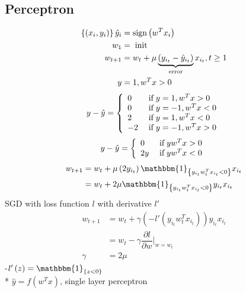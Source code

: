 \documentclass{article}
\begin{document}
\subsection{Perceptron}
\begin{align*}
\left\{\left(x_{i}, y_{i}\right)\right\} \hat{y}_{i} &= \text{sign}\left(w^{T} x_{i}\right)
\\ w_{1} &= \text{\;init\;}
\\ w_{t+1} &= w_{t} + \mu \underbrace{\left(y_{i_{t}} - \hat{y}_{i_{t}}\right)}_{\text{\;error\;}} x_{i_{t}}, t \geq  1
\\ y &= 1, w^{T} x > 0
\end{align*}
\[ y - \hat{y} =\left\{ \begin{array}{ll}
0& \text{\;if\;} y = 1, w^{T} x > 0 \\
0& \text{\;if\;} y = -1, w^{T} x < 0 \\
2& \text{\;if\;} y = 1, w^{T} x < 0 \\
-2& \text{\;if\;} y = -1, w^{T} x > 0 \\
\end{array}\right. \]
\[ y - \hat{y} =\left\{ \begin{array}{ll}
0& \text{\;if\;} y w^{T} x > 0 \\
2 y& \text{\;if\;} y w^{T} x < 0 \\
\end{array}\right. \]
\begin{align*}
w_{t+1} &= w_{t} + \mu \left(2 y_{i_{t}}\right) \mathbbm{1}_{\left\{y_{i_{t}} w_{t}^{T} x_{i_{t}} < 0\right\}} x_{i_{t}}
\\ &= w_{t} + 2 \mu \mathbbm{1}_{\left\{y_{i_{t}} w_{t}^{T} x_{i_{t}} < 0\right\}} y_{i_{t}} x_{i_{t}}
\end{align*}
SGD with loss function $l $ with derivative $l'$
\begin{align*}
w_{t+1} &= w_{t} + \gamma \left(-l'\left(y_{i_{t}} w_{t}^{T} x_{i_{t}}\right)\right) y_{i_{t}} x_{i_{t}}
\\ &= w_{t} - \gamma \dfrac{\partial l}{\partial w} \bigg|_{w = w_{t}}
\\ \gamma &= 2 \mu
\end{align*}
-$l'\left(z\right) = \mathbbm{1}_{\left\{z < 0\right\}}$
\\* $\hat{y} = f\left(w^{T} x\right)$, single layer perceptron
\end{document}
